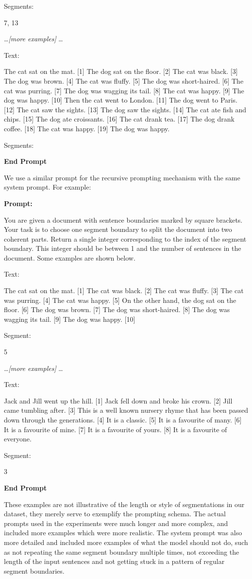 Segments: 

7, 13

\ldots \emph{[more examples]} \ldots

Text: 

The cat sat on the mat. [1] The dog sat on the floor. [2] The cat was black. [3] The dog was brown. [4] The cat was fluffy. [5] The dog was short-haired. [6] The cat was purring. [7] The dog was wagging its tail. [8] The cat was happy. [9] The dog was happy. [10] Then the cat went to London. [11] The dog went to Paris. [12] The cat saw the sights. [13] The dog saw the sights. [14] The cat ate fish and chips. [15] The dog ate croissants. [16] The cat drank tea. [17] The dog drank coffee. [18] The cat was happy. [19] The dog was happy.

Segments:

\textbf{End Prompt}

We use a similar prompt for the recursive prompting mechanism with the same system prompt. For example:

\textbf{Prompt:}

You are given a document with sentence boundaries marked by square brackets. Your task is to choose one segment boundary to split the document into two coherent parts. Return a single integer corresponding to the index of the segment boundary. This integer should be between 1 and the number of sentences in the document. Some examples are shown below.

Text:

The cat sat on the mat. [1] The cat was black. [2] The cat was fluffy. [3] The cat was purring. [4] The cat was happy. [5] On the other hand, the dog sat on the floor. [6] The dog was brown. [7] The dog was short-haired. [8] The dog was wagging its tail. [9] The dog was happy. [10]

Segment:

5

\ldots \emph{[more examples]} \ldots

Text: 

Jack and Jill went up the hill. [1] Jack fell down and broke his crown. [2] Jill came tumbling after. [3] This is a well known nursery rhyme that has been passed down through the generations. [4] It is a classic. [5] It is a favourite of many. [6] It is a favourite of mine. [7] It is a favourite of yours. [8] It is a favourite of everyone.

Segment:

3

\textbf{End Prompt}

These examples are not illustrative of the length or style of segmentations in our dataset, they merely serve to exemplify the prompting schema. The actual prompts used in the experiments were much longer and more complex, and included more examples which were more realistic. The system prompt was also more detailed and included more examples of what the model should not do, such as not repeating the same segment boundary multiple times, not exceeding the length of the input sentences and not getting stuck in a pattern of regular segment boundaries.